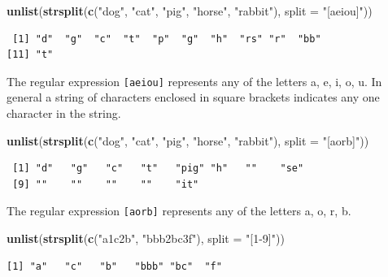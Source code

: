 \documentclass[
]{krantz}
\makeatletter
\newenvironment{Shaded}{\begin{snugshade}}{\end{snugshade}}
\newcommand{\DataTypeTok}[1]{\textcolor[rgb]{0.27,0.27,0.27}{#1}}
\newcommand{\KeywordTok}[1]{\textcolor[rgb]{0.27,0.27,0.27}{\textbf{#1}}}
\newcommand{\NormalTok}[1]{#1}
\newcommand{\StringTok}[1]{\textcolor[rgb]{0.5,0.5,0.5}{#1}}
\newenvironment{kframe}{%
\medskip{}
\setlength{\fboxsep}{.8em}
 \def\at@end@of@kframe{}%
 \ifinner\ifhmode%
  \def\at@end@of@kframe{\end{minipage}}%
  \begin{minipage}{\columnwidth}%
 \fi\fi%
 \def\FrameCommand##1{\hskip\@totalleftmargin \hskip-\fboxsep
 \colorbox{shadecolor}{##1}\hskip-\fboxsep
     \hskip-\linewidth \hskip-\@totalleftmargin \hskip\columnwidth}%
 \MakeFramed {\advance\hsize-\width
   \@totalleftmargin\z@ \linewidth\hsize
   \@setminipage}}%
 {\par\unskip\endMakeFramed%
 \at@end@of@kframe}
\renewenvironment{Shaded}{\begin{kframe}}{\end{kframe}}
\makeatother
\begin{document}
\begin{Shaded}
\begin{Highlighting}[]
\KeywordTok{unlist}\NormalTok{(}\KeywordTok{strsplit}\NormalTok{(}\KeywordTok{c}\NormalTok{(}\StringTok{"dog"}\NormalTok{, }\StringTok{"cat"}\NormalTok{, }\StringTok{"pig"}\NormalTok{, }\StringTok{"horse"}\NormalTok{, }\StringTok{"rabbit"}\NormalTok{), }
                \DataTypeTok{split =} \StringTok{"[aeiou]"}\NormalTok{))}
\end{Highlighting}
\end{Shaded}

\begin{verbatim}
 [1] "d"  "g"  "c"  "t"  "p"  "g"  "h"  "rs" "r"  "bb"
[11] "t" 
\end{verbatim}

The regular expression \texttt{{[}aeiou{]}} represents any of the letters a, e, i, o, u. In general a string of characters enclosed in square brackets indicates any one character in the string.

\begin{Shaded}
\begin{Highlighting}[]
\KeywordTok{unlist}\NormalTok{(}\KeywordTok{strsplit}\NormalTok{(}\KeywordTok{c}\NormalTok{(}\StringTok{"dog"}\NormalTok{, }\StringTok{"cat"}\NormalTok{, }\StringTok{"pig"}\NormalTok{, }\StringTok{"horse"}\NormalTok{, }\StringTok{"rabbit"}\NormalTok{), }
                \DataTypeTok{split =} \StringTok{"[aorb]"}\NormalTok{))}
\end{Highlighting}
\end{Shaded}

\begin{verbatim}
 [1] "d"   "g"   "c"   "t"   "pig" "h"   ""    "se" 
 [9] ""    ""    ""    ""    "it" 
\end{verbatim}

The regular expression \texttt{{[}aorb{]}} represents any of the letters a, o, r, b.

\begin{Shaded}
\begin{Highlighting}[]
\KeywordTok{unlist}\NormalTok{(}\KeywordTok{strsplit}\NormalTok{(}\KeywordTok{c}\NormalTok{(}\StringTok{"a1c2b"}\NormalTok{, }\StringTok{"bbb2bc3f"}\NormalTok{), }\DataTypeTok{split =} \StringTok{"[1{-}9]"}\NormalTok{))}
\end{Highlighting}
\end{Shaded}

\begin{verbatim}
[1] "a"   "c"   "b"   "bbb" "bc"  "f"  
\end{verbatim}
\end{document}
